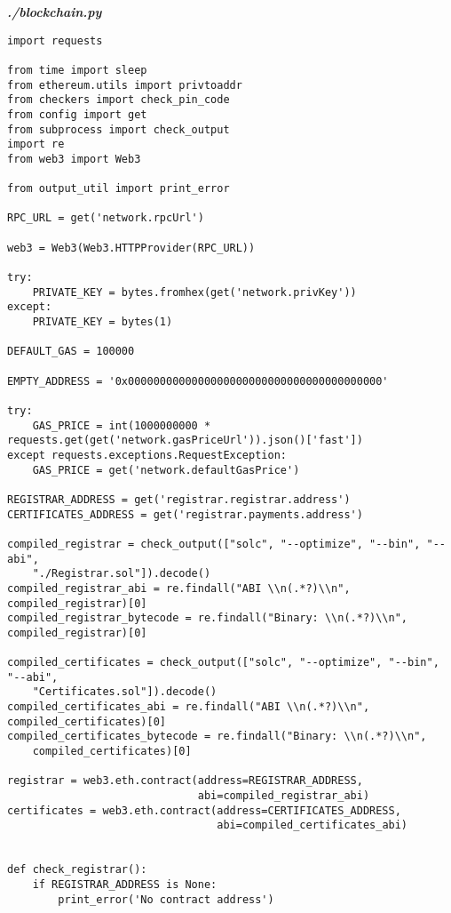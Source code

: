 \textit{\textbf{./blockchain.py}}
\begin{verbatim}
import requests

from time import sleep
from ethereum.utils import privtoaddr
from checkers import check_pin_code
from config import get
from subprocess import check_output
import re
from web3 import Web3

from output_util import print_error

RPC_URL = get('network.rpcUrl')

web3 = Web3(Web3.HTTPProvider(RPC_URL))

try:
    PRIVATE_KEY = bytes.fromhex(get('network.privKey'))
except:
    PRIVATE_KEY = bytes(1)

DEFAULT_GAS = 100000

EMPTY_ADDRESS = '0x0000000000000000000000000000000000000000'

try:
    GAS_PRICE = int(1000000000 * requests.get(get('network.gasPriceUrl')).json()['fast'])
except requests.exceptions.RequestException:
    GAS_PRICE = get('network.defaultGasPrice')

REGISTRAR_ADDRESS = get('registrar.registrar.address')
CERTIFICATES_ADDRESS = get('registrar.payments.address')

compiled_registrar = check_output(["solc", "--optimize", "--bin", "--abi", 
    "./Registrar.sol"]).decode()
compiled_registrar_abi = re.findall("ABI \\n(.*?)\\n", compiled_registrar)[0]
compiled_registrar_bytecode = re.findall("Binary: \\n(.*?)\\n", compiled_registrar)[0]

compiled_certificates = check_output(["solc", "--optimize", "--bin", "--abi", 
    "Certificates.sol"]).decode()
compiled_certificates_abi = re.findall("ABI \\n(.*?)\\n", compiled_certificates)[0]
compiled_certificates_bytecode = re.findall("Binary: \\n(.*?)\\n", 
    compiled_certificates)[0]

registrar = web3.eth.contract(address=REGISTRAR_ADDRESS,
                              abi=compiled_registrar_abi)
certificates = web3.eth.contract(address=CERTIFICATES_ADDRESS,
                                 abi=compiled_certificates_abi)


def check_registrar():
    if REGISTRAR_ADDRESS is None:
        print_error('No contract address')


\end{verbatim}
